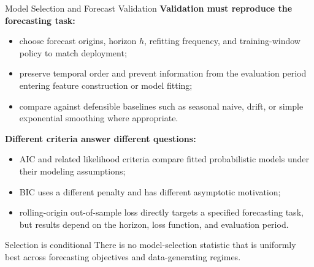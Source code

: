 \documentclass[aspectratio=169]{beamer}
\begin{document}
\begin{frame}{Model Selection and Forecast Validation}
  \textbf{Validation must reproduce the forecasting task:}
  \begin{itemize}
    \item choose forecast origins, horizon $h$, refitting frequency, and training-window policy to match deployment;
    \item preserve temporal order and prevent information from the evaluation period entering feature construction or model fitting;
    \item compare against defensible baselines such as seasonal naive, drift, or simple exponential smoothing where appropriate.
  \end{itemize}

  \vspace{0.4em}

  \textbf{Different criteria answer different questions:}
  \begin{itemize}
    \item AIC and related likelihood criteria compare fitted probabilistic models under their modeling assumptions;
    \item BIC uses a different penalty and has different asymptotic motivation;
    \item rolling-origin out-of-sample loss directly targets a specified forecasting task, but results depend on the horizon, loss function, and evaluation period.
  \end{itemize}

  \begin{alertbox}{Selection is conditional}
    There is no model-selection statistic that is uniformly best across forecasting objectives and data-generating regimes.
  \end{alertbox}
\end{frame}
\end{document}
